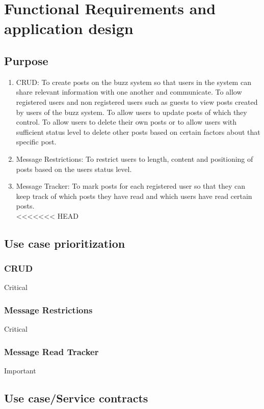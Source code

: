 \documentclass[12pt, oneside]{book}
\begin{document}
\section{Functional Requirements and application design}

\subsection{Purpose}
\begin{enumerate}
 \item{CRUD}: To create posts on the buzz system so that users in the system can share relevant information with one another and communicate. To allow registered users and non registered users such as guests to view posts created by users of the buzz system. To allow users to update posts of which they control. To allow users to delete their own posts or to allow users with sufficient status level to delete other posts based on certain factors about that specific post.
 \\
\item{Message Restrictions}: To restrict users to length, content and positioning of posts based on the users status level. 
\\
 \item{Message Tracker}: To mark posts for each registered user so that they can keep track of which posts they have read and which users have read certain posts.
\\

<<<<<<< HEAD
 
\end{enumerate}

\subsection{Use case prioritization}
\subsubsection{CRUD}
Critical
\subsubsection{Message Restrictions}
Critical
\subsubsection{Message Read Tracker}
Important
\subsection{Use case/Service contracts}
\end{document}
